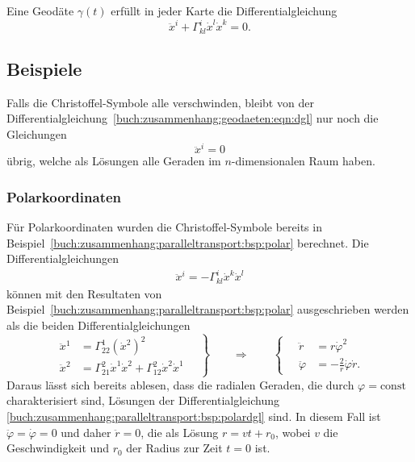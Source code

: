 \begin{satz}
Eine Geodäte $\gamma(t)$ erfüllt in jeder Karte die Differentialgleichung
\begin{equation}
\ddot{x}^i
+
\Gamma^i_{kl} \dot{x}^l \dot{x}^k
=
0.
\label{buch:zusammenhang:geodaeten:eqn:dgl}
\end{equation}
\end{satz}

%
%
\subsection{Beispiele
\label{buch:zusammenhang:geodaeten:subsection:beispiele}}
Falls die Christoffel-Symbole alle verschwinden, bleibt von der
Differentialgleichung~\eqref{buch:zusammenhang:geodaeten:eqn:dgl}
nur noch die Gleichungen
\[
\ddot{x}^i = 0
\]
übrig, welche als Lösungen alle Geraden im $n$-dimensionalen
Raum haben.

%
%
\subsubsection{Polarkoordinaten}
Für Polarkoordinaten wurden die Christoffel-Symbole bereits
in Beispiel~\ref{buch:zusammenhang:paralleltransport:bsp:polar}
berechnet.
Die Differentialgleichungen
\begin{align*}
\ddot{x}^i=-\Gamma^i_{kl}\dot{x}^k\dot{x}^l
\end{align*}
können mit den Resultaten von 
Beispiel~\ref{buch:zusammenhang:paralleltransport:bsp:polar}
ausgeschrieben werden als die beiden Differentialgleichungen
\begin{equation}
\left.
\begin{aligned}
\ddot{x}^1
&=
\Gamma^1_{22}(\dot{x}^2)^2
\\
\ddot{x}^2
&=
\Gamma^2_{21}\dot{x}^1\dot{x}^2
+
\Gamma^2_{12}\dot{x}^2\dot{x}^1
\end{aligned}
\quad
\right\}
\qquad
\Rightarrow
\qquad
\left\{
\quad
\begin{aligned}
\ddot{r}
&=
r \dot{\varphi}^2
\\
\ddot{\varphi}
&=
-\frac{2}{r}\dot{\varphi}\dot{r}.
\end{aligned}
\right.
\label{buch:zusammenhang:paralleltransport:bsp:polardgl}
\end{equation}
Daraus lässt sich bereits ablesen, dass die radialen Geraden, die
durch $\varphi=\text{const}$ charakterisiert sind, Lösungen
der Differentialgleichung
\eqref{buch:zusammenhang:paralleltransport:bsp:polardgl}
sind.
In diesem Fall ist $\ddot{\varphi}=\dot{\varphi}=0$ und
daher $\ddot{r}=0$, die als Lösung $r=vt+r_0$, wobei $v$ die Geschwindigkeit
und $r_0$ der Radius zur Zeit $t=0$ ist.

